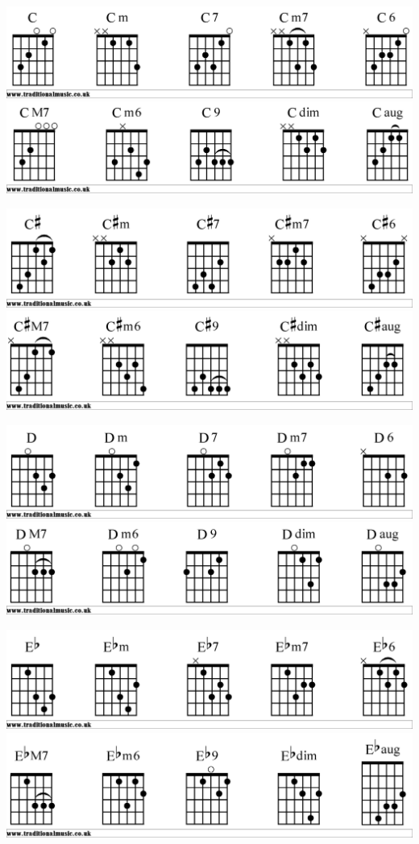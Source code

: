 \includegraphics[scale=.15]{chords/Cgtr1}
\includegraphics[scale=.15]{chords/Cgtr2}

\includegraphics[scale=.15]{chords/Csgtr1}
\includegraphics[scale=.15]{chords/Csgtr2}

\includegraphics[scale=.15]{chords/Dgtr1}
\includegraphics[scale=.15]{chords/Dgtr2}

\includegraphics[scale=.15]{chords/Ebgtr1}
\includegraphics[scale=.15]{chords/Ebgtr2}


